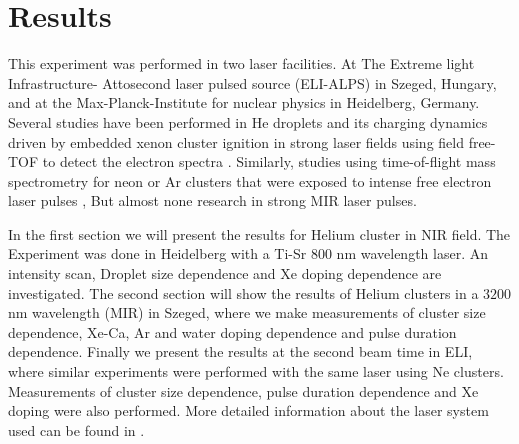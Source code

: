 
\chapter{Results}

This experiment was performed in two laser facilities. At The Extreme light Infrastructure- Attosecond laser pulsed source (ELI-ALPS) in Szeged, Hungary, and at the Max-Planck-Institute for nuclear physics in Heidelberg, Germany. Several studies have been performed in He droplets and its charging dynamics driven by embedded xenon cluster ignition in strong laser fields using field free-TOF to detect the electron spectra\cite{kelbg_auger_2019} \cite{kelbg_comparison_2018}. Similarly, studies  using time-of-flight mass spectrometry for neon or Ar clusters that were exposed to intense free electron laser pulses \cite{oelze_correlated_2017}\cite{nagaya_unusual_2013}, But almost none research in strong MIR laser pulses.

In the first section we will present the results for Helium cluster in NIR field. The Experiment was done in Heidelberg with a Ti-Sr $800$ nm wavelength laser. An intensity scan, Droplet size dependence and Xe doping dependence are investigated. The second section will show the results of Helium clusters in a $3200$ nm wavelength (MIR) in Szeged, where we make measurements  of cluster size dependence, Xe-Ca, Ar  and water doping dependence and pulse duration dependence. Finally we present the results at the second beam time in ELI, where similar experiments were performed with the same laser using Ne clusters. Measurements of cluster size dependence, pulse duration dependence and Xe doping were also performed. More detailed information about the laser system used can be found in \cite {thire_highly_2018}.


